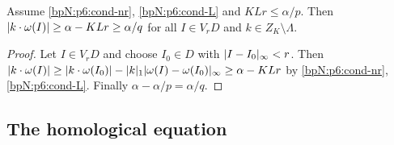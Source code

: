 \begin{lemma}\label{bpN:p6:divisor}
Assume \ref{bpN:p6:cond-nr}, \ref{bpN:p6:cond-L} and $KLr\le\alpha/p$. Then $\lvert k\cdot\omega(I)\rvert\ge\alpha-KLr\ge\alpha/q$ for all $I\in V_rD$ and $k\in Z_K\setminus\Lambda$.
\end{lemma}
\begin{proof}
\label{stepN:p6:div} Let $I\in V_rD$ and choose $I_0\in D$ with $\lvert I-I_0\rvert_\infty<r$. Then $\lvert k\cdot\omega(I)\rvert\ge\lvert k\cdot\omega(I_0)\rvert-\lvert k\rvert_1\lvert \omega(I)-\omega(I_0)\rvert_\infty\ge\alpha-KLr$ by \ref{bpN:p6:cond-nr}, \ref{bpN:p6:cond-L}. Finally $\alpha-\alpha/p=\alpha/q$.
\end{proof}

\subsection{The homological equation}\label{bpN:p6:s-hom}

